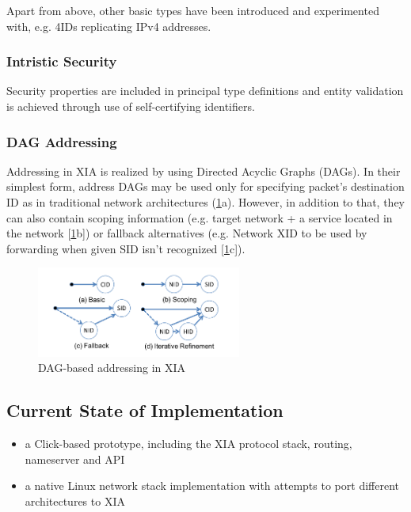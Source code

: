                 Apart from above, other basic types have been introduced and experimented with, e.g. 4IDs replicating IPv4 addresses.

            \subsubsection{Intristic Security}

                Security properties are included in principal type definitions and entity validation is achieved through use of self-certifying identifiers.

            \subsubsection{DAG Addressing}

                Addressing in XIA is realized by using Directed Acyclic Graphs (DAGs). In their simplest form, address DAGs may be used only for specifying packet's destination ID as in traditional network architectures (\ref{fig:xia_dag}a). However, in addition to that, they can also contain scoping information (e.g. target network + a service located in the network [\ref{fig:xia_dag}b]) or fallback alternatives (e.g. Network XID to be used by forwarding when given SID isn't recognized [\ref{fig:xia_dag}c]).

                \begin{figure}[H]
                    \begin{center}
                        \includegraphics[width=0.6\textwidth]{fig/archs_xia-dag.png}
                        \caption{DAG-based addressing in XIA}
                        \label{fig:xia_dag}
                    \end{center}
                \end{figure}

        \subsection{Current State of Implementation}

            \begin{itemize}
                \item a Click-based prototype, including the XIA protocol stack, routing, nameserver and API
                \item a native Linux network stack implementation with attempts to port different architectures to XIA
            \end{itemize}


